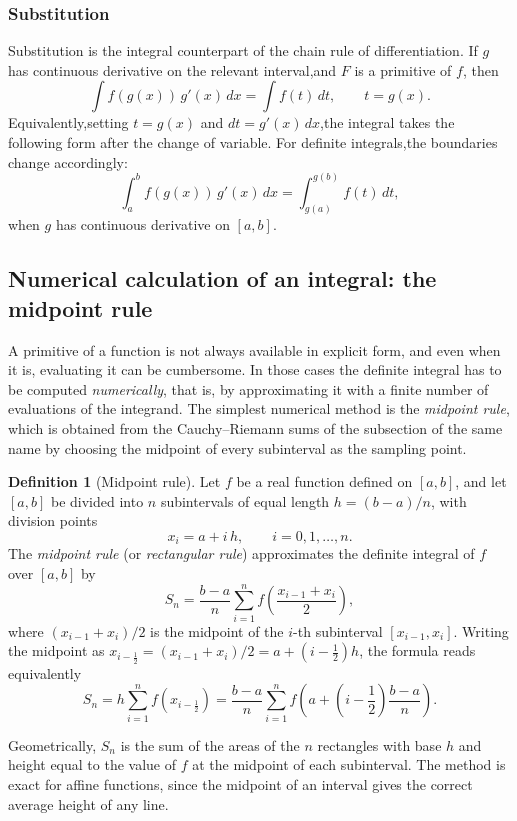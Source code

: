 \documentclass[11pt,a4paper]{article}
\theoremstyle{definition} \newtheorem{definition}{Definition} \theoremstyle{plain} \newtheorem{theorem}{Theorem}
\begin{document}
\subsubsection{Substitution}
Substitution is the integral counterpart of the chain rule of differentiation.
If $g$ has continuous derivative on the relevant interval,and $F$ is a primitive of $f$, then \[ \int f(g(x))\,g'(x)\,dx = \int f(t)\,dt,\qquad t=g(x). \] Equivalently,setting $t=g(x)$ and $dt=g'(x)\,dx$,the integral takes the following form after the change of variable.
For definite integrals,the boundaries change accordingly: \[ \int_a^b f(g(x))\,g'(x)\,dx = \int_{g(a)}^{g(b)} f(t)\,dt, \] when $g$ has continuous derivative on $[a,b]$.
\subsection{Numerical calculation of an integral: the midpoint rule}

A primitive of a function is not always available in explicit form, and even
when it is, evaluating it can be cumbersome.  In those cases the definite
integral has to be computed \emph{numerically}, that is, by approximating it
with a finite number of evaluations of the integrand.  The simplest numerical
method is the \emph{midpoint rule}, which is obtained from the
Cauchy--Riemann sums of the subsection of the same name by choosing the
midpoint of every subinterval as the sampling point.

\begin{definition}[Midpoint rule]
Let $f$ be a real function defined on $[a,b]$, and let $[a,b]$ be divided
into $n$ subintervals of equal length
$h=(b-a)/n$, with division points
\[
x_i = a + i\,h, \qquad i=0,1,\ldots,n.
\]
The \emph{midpoint rule} (or \emph{rectangular rule}) approximates the
definite integral of $f$ over $[a,b]$ by
\[
S_n = \frac{b-a}{n}\sum_{i=1}^{n} f\!\left(\frac{x_{i-1}+x_i}{2}\right),
\]
where $(x_{i-1}+x_i)/2$ is the midpoint of the $i$-th subinterval
$[x_{i-1},x_i]$.  Writing the midpoint as
$x_{i-\frac12}=(x_{i-1}+x_i)/2=a+(i-\frac12)h$, the formula reads
equivalently
\[
S_n = h\sum_{i=1}^{n} f\!\left(x_{i-\frac12}\right)
    = \frac{b-a}{n}\sum_{i=1}^{n}
      f\!\left(a+\left(i-\frac12\right)\frac{b-a}{n}\right).
\]
\end{definition}

Geometrically, $S_n$ is the sum of the areas of the $n$ rectangles with base
$h$ and height equal to the value of $f$ at the midpoint of each subinterval.
The method is exact for affine functions, since the midpoint of an interval
gives the correct average height of any line.
\end{document}
